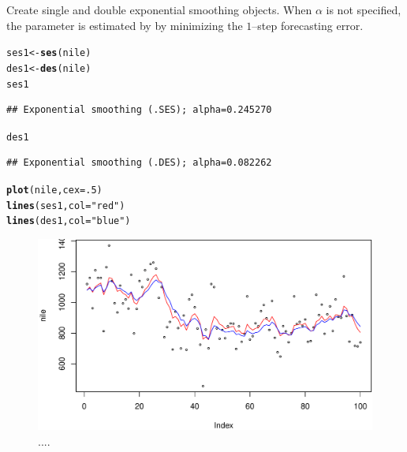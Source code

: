 \documentclass[10pt]{article}\usepackage[]{graphicx}\usepackage[]{color}
\makeatletter
\def\maxwidth{ %
  \ifdim\Gin@nat@width>\linewidth
    \linewidth
  \else
    \Gin@nat@width
  \fi
}
\newcommand{\hlnum}[1]{\textcolor[rgb]{0.686,0.059,0.569}{#1}}%
\newcommand{\hlstr}[1]{\textcolor[rgb]{0.192,0.494,0.8}{#1}}%
\newcommand{\hlstd}[1]{\textcolor[rgb]{0.345,0.345,0.345}{#1}}%
\newcommand{\hlkwb}[1]{\textcolor[rgb]{0.69,0.353,0.396}{#1}}%
\newcommand{\hlkwc}[1]{\textcolor[rgb]{0.333,0.667,0.333}{#1}}%
\newcommand{\hlkwd}[1]{\textcolor[rgb]{0.737,0.353,0.396}{\textbf{#1}}}%
\newenvironment{kframe}{%
 \def\at@end@of@kframe{}%
 \ifinner\ifhmode%
  \def\at@end@of@kframe{\end{minipage}}%
  \begin{minipage}{\columnwidth}%
 \fi\fi%
 \def\FrameCommand##1{\hskip\@totalleftmargin \hskip-\fboxsep
 \colorbox{shadecolor}{##1}\hskip-\fboxsep
     \hskip-\linewidth \hskip-\@totalleftmargin \hskip\columnwidth}%
 \MakeFramed {\advance\hsize-\width
   \@totalleftmargin\z@ \linewidth\hsize
   \@setminipage}}%
 {\par\unskip\endMakeFramed%
 \at@end@of@kframe}
\newenvironment{knitrout}{}{} %
\makeatother
\begin{document}
Create single and double exponential smoothing objects. When $\alpha$
is not specified, the parameter is estimated by by minimizing the
$1$--step forecasting error.
\begin{knitrout}
\color{fgcolor}\begin{kframe}
\begin{alltt}
\hlstd{ses1} \hlkwb{<-} \hlkwd{ses}\hlstd{(nile)}
\hlstd{des1} \hlkwb{<-} \hlkwd{des}\hlstd{(nile)}
\hlstd{ses1}
\end{alltt}
\begin{verbatim}
## Exponential smoothing (.SES); alpha=0.245270
\end{verbatim}
\begin{alltt}
\hlstd{des1}
\end{alltt}
\begin{verbatim}
## Exponential smoothing (.DES); alpha=0.082262
\end{verbatim}
\end{kframe}
\end{knitrout}

\begin{knitrout}
\color{fgcolor}\begin{kframe}
\begin{alltt}
\hlkwd{plot}\hlstd{(nile,} \hlkwc{cex}\hlstd{=}\hlnum{.5}\hlstd{)}
\hlkwd{lines}\hlstd{(ses1,} \hlkwc{col}\hlstd{=}\hlstr{"red"}\hlstd{)}
\hlkwd{lines}\hlstd{(des1,} \hlkwc{col}\hlstd{=}\hlstr{"blue"}\hlstd{)}
\end{alltt}
\end{kframe}\begin{figure}
\includegraphics[width=\maxwidth]{fig/graphunnamed-chunk-8-1} \caption[...]{....}\label{fig:unnamed-chunk-8}
\end{figure}


\end{knitrout}
\end{document}
